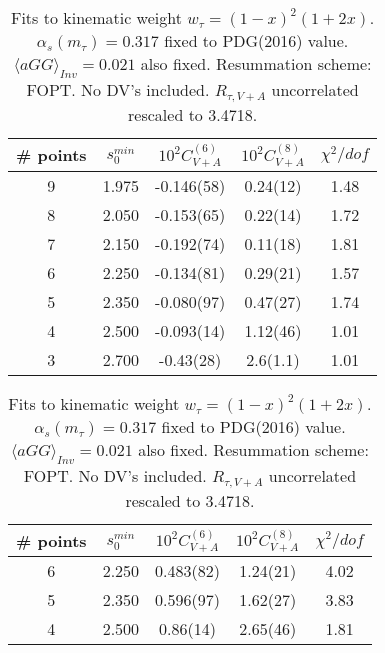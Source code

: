 \documentclass[12pt]{article}
\begin{document}
\begin{table}
  \centering
  \begin{tabular}{ | c c c c c | }
    \hline
    \# points & $s_0^{min}$ & $10^2 C_{V+A}^{(6)}$ & $10^2 C_{V+A}^{(8)}$ & $\chi^2/dof$ \\ 
    \hline
    9 & 1.975 & -0.146(58) & 0.24(12) & 1.48 \\ 
    8 & 2.050 & -0.153(65) & 0.22(14) & 1.72 \\
    7 & 2.150 & -0.192(74) & 0.11(18) & 1.81 \\
    6 & 2.250 & -0.134(81) & 0.29(21) & 1.57 \\
    5 & 2.350 & -0.080(97) & 0.47(27) & 1.74 \\
    4 & 2.500 & -0.093(14) & 1.12(46) & 1.01 \\
    3 & 2.700 & -0.43(28)  & 2.6(1.1) & 1.01 \\
    \hline
  \end{tabular}
  \caption{Fits to kinematic weight $w_{\tau} = (1 - x)^2 (1 + 2x)$.
    $\alpha_s(m_{\tau}) = 0.317$ fixed to PDG(2016) value. $\langle aGG
    \rangle_{Inv} = 0.021$ also fixed. Resummation scheme: FOPT. No DV's included.
    $R_{\tau, V+A}$ uncorrelated rescaled to 3.4718.}
\end{table}

\begin{table}
  \centering
  \begin{tabular}{ | c c c c c | }
    \hline
    \# points & $s_0^{min}$ & $10^2 C_{V+A}^{(6)}$ & $10^2 C_{V+A}^{(8)}$ & $\chi^2/dof$ \\ 
    \hline
    6 & 2.250 & 0.483(82) & 1.24(21) & 4.02 \\
    5 & 2.350 & 0.596(97) & 1.62(27) & 3.83 \\
    4 & 2.500 & 0.86(14)  & 2.65(46) & 1.81 \\
    \hline
  \end{tabular}
  \caption{Fits to kinematic weight $w_{\tau} = (1 - x)^2 (1 + 2x)$.
    $\alpha_s(m_{\tau}) = 0.317$ fixed to PDG(2016) value. $\langle aGG
    \rangle_{Inv} = 0.021$ also fixed. Resummation scheme: FOPT. No DV's included.
    $R_{\tau, V+A}$ uncorrelated rescaled to 3.4718.}
\end{table}
\end{document}
